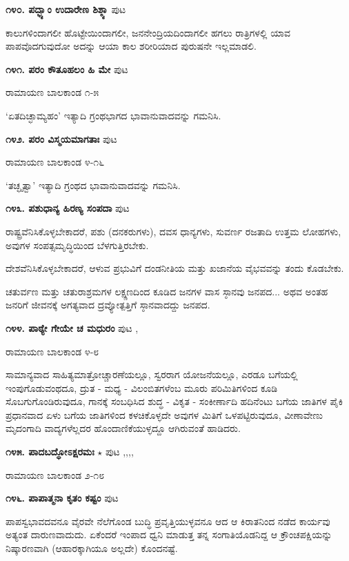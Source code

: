 \medskip
\noindent\textbf{೧೪೦. ಪದ್ಭ್ಯಾಂ ಉದಾರೇಣ ಶಿಶ್ಠ್ಯಾ} \hfill ಪುಟ \pageref{26}

ಕಾಲುಗಳಿಂದಾಗಲೀ ಹೊಟ್ಟೇಯಿಂದಾಗಲೀ, ಜನನೇಂದ್ರಿಯದಿಂದಾಗಲೀ ಹಗಲು ರಾತ್ರಿಗಳಲ್ಲಿ ಯಾವ ಪಾಪವೊದಗುವುದೋ ಅದನ್ನು ಆಯಾ ಕಾಲ ಶರೀರಿಯಾದ ಪುರುಷನೇ ಇಲ್ಲಮಾಡಲಿ.

\medskip
\noindent\textbf{೧೪೧. ಪರಂ ಕೌತೂಹಲಂ ಹಿ ಮೇ} \hfill ಪುಟ \pageref{163}

\hfill ರಾಮಾಯಣ ಬಾಲಕಾಂಡ ೧-೫

`ಏತದಿಚ್ಛಾಮ್ಯಹಂ' ಇತ್ಯಾದಿ ಗ್ರಂಥಭಾಗದ ಭಾವಾನುವಾದವನ್ನು ಗಮನಿಸಿ.

\medskip
\noindent\textbf{೧೪೨. ಪರಂ ವಿಸ್ಮಯಮಾಗತಾಃ} \hfill ಪುಟ \pageref{211a}

\hfill ರಾಮಾಯಣ ಬಾಲಕಾಂಡ ೪-೧೬

`ತಚ್ಛೃತ್ವಾ' ಇತ್ಯಾದಿ ಗ್ರಂಥದ ಭಾವಾನುವಾದವನ್ನು ಗಮನಿಸಿ.

\medskip
\noindent\textbf{೧೪೩. ಪಶುಧಾನ್ಯ ಹಿರಣ್ಯ ಸಂಪದಾ} \hfill ಪುಟ \pageref{227}

ರಾಷ್ಟ್ರವೆನಿಸಿಕೊಳ್ಳಬೇಕಾದರೆ, ಪಶು (ದನಕರುಗಳು), ದವಸ ಧಾನ್ಯಗಳು, ಸುವರ್ಣ ರಜತಾದಿ ಉತ್ತಮ ಲೋಹಗಳು, ಅವುಗಳ ಸಂಪತ್ಸಮೃದ್ಧಿಯಿಂದ ಬೆಳಗುತ್ತಿರಬೇಕು. 

ದೇಶವೆನಿಸಿಕೊಳ್ಳಬೇಕಾದರೆ, ಆಳುವ ಪ್ರಭುವಿಗೆ ದಂಡನೀತಿಯ ಮತ್ತು ಖಜಾನೆಯ ವೈಭವವನ್ನು ತಂದು ಕೊಡಬೇಕು.

ಚತುರ್ವಣ ಮತ್ತು ಚತುರಾಶ್ರಮಗಳ ಲಕ್ಷ್ಣಣದಿಂದ ಕೂಡಿದ ಜನಗಳ ವಾಸ ಸ್ಠಾನವು ಜನಪದ... ಅಥವ ಅಂತಹ ಜನರಿಗೆ ಜೀವನಕ್ಕೆ ಅಗತ್ಯವಾದ ದ್ರವ್ಯೋತ್ಪತ್ತಿಗೆ ಸ್ಠಾನವಾದದ್ದು ಜನಪದ.

\medskip
\noindent\textbf{೧೪೪. ಪಾಠ್ಯೇ ಗೇಯೇ ಚ ಮಧುರಂ} \hfill ಪುಟ \pageref{164a},\pageref{250}

\hfill ರಾಮಾಯಣ ಬಾಲಕಾಂಡ ೪-೮

ಸಾಮಾನ್ಯವಾದ ಸಾಹಿತ್ಯಮಾತ್ರೋಚ್ಚಾರಣೆಯಲ್ಲೂ, ಸ್ವರರಾಗ ಯೋಜನೆಯಲ್ಲೂ, ಎರಡೂ ಬಗೆಯಲ್ಲಿ ಇಂಪುಗೊಡುವಂಥದೂ, ದ್ರುತ - ಮಧ್ಯ - ವಿಲಂಬಿತಗಳೆಂಬ ಮೂರು ಪರಿಮಿತಿಗಳಿಂದ ಕೂಡಿ ಸೊಬಗುಗೊಂಡಿರುವುದೂ, ಗಾನಕ್ಕೆ ಸಂಬಧಿಸಿದ ಶುದ್ಧ - ವಿಕೃತ - ಸಂಕೀರ್ಣಾದಿ ಹದಿನೆಂಟು ಬಗೆಯ ಜಾತಿಗಳ ಪೈಕಿ ಪ್ರಧಾನವಾದ ಏಳು ಬಗೆಯ ಜಾತಿಗಳಿಂದ ಕಳಚಿಕೊಳ್ಳದೇ ಅವುಗಳ ಮಿತಿಗೆ ಒಳಪಟ್ಟಿರುವುದೂ, ವೀಣಾವೇಣು ಮೃದಂಗಾದಿ ವಾದ್ಯಗಳೆಲ್ಲದರ  ಹೊಂದಾಣಿಕೆಯುಳ್ಳದ್ದೂ ಆಗಿರುವಂತೆ ಹಾಡಿದರು.

\medskip
\noindent\textbf{೧೪೫. ಪಾದಬದ್ಧೋಽಕ್ಷರಮಃ} $\star$ \hfill ಪುಟ \pageref{20b},\pageref{157a},\pageref{201},\pageref{213},\pageref{242}

\hfill ರಾಮಾಯಣ ಬಾಲಕಾಂಡ ೨-೧೮

\medskip
\noindent\textbf{೧೪೬. ಪಾಪಾತ್ಮನಾ ಕೃತಂ ಕಷ್ಟಂ} \hfill ಪುಟ \pageref{203a}

ಪಾಪಸ್ವಭಾವದವನೂ ವೈರವೇ ನೆಲೆಗೊಂಡ ಬುದ್ಧಿ ಪ್ರವೃತ್ತಿಯುಳ್ಳವನೂ ಆದ ಆ ಕಿರಾತನಿಂದ ನಡೆದ ಕಾರ್ಯವು ಅತ್ಯಂತ ದಾರುಣವಾದುದು. ಏಕೆಂದರೆ ಇಂಪಾದ ಧ್ವನಿ ಮಾಡುತ್ತ ತನ್ನ ಸಂಗಾತಿಯೊಡನಿದ್ದ ಆ ಕ್ರೌಂಚಪಕ್ಷಿಯನ್ನು ನಿಷ್ಕಾರಣವಾಗಿ (ಆಹಾರಕ್ಕಾಗಿಯೂ ಅಲ್ಲದೇ) ಕೊಂದನಷ್ಟೆ.

